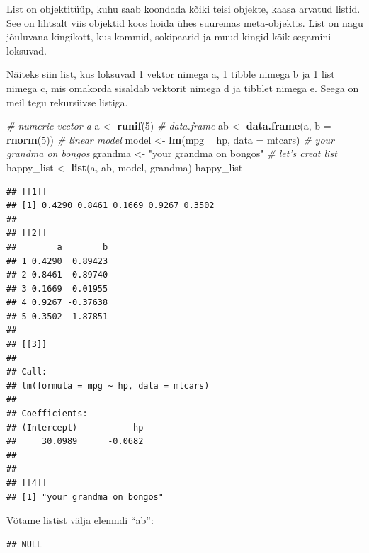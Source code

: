 \documentclass[]{book}
\newenvironment{Shaded}{\begin{snugshade}}{\end{snugshade}}
\newcommand{\KeywordTok}[1]{\textcolor[rgb]{0.13,0.29,0.53}{\textbf{#1}}}
\newcommand{\DataTypeTok}[1]{\textcolor[rgb]{0.13,0.29,0.53}{#1}}
\newcommand{\DecValTok}[1]{\textcolor[rgb]{0.00,0.00,0.81}{#1}}
\newcommand{\StringTok}[1]{\textcolor[rgb]{0.31,0.60,0.02}{#1}}
\newcommand{\CommentTok}[1]{\textcolor[rgb]{0.56,0.35,0.01}{\textit{#1}}}
\newcommand{\OperatorTok}[1]{\textcolor[rgb]{0.81,0.36,0.00}{\textbf{#1}}}
\newcommand{\NormalTok}[1]{#1}
\begin{document}
List on objektitüüp, kuhu saab koondada kõiki teisi objekte, kaasa
arvatud listid. See on lihtsalt viis objektid koos hoida ühes suuremas
meta-objektis. List on nagu jõuluvana kingikott, kus kommid, sokipaarid
ja muud kingid kõik segamini loksuvad.

Näiteks siin list, kus loksuvad 1 vektor nimega a, 1 tibble nimega b ja
1 list nimega c, mis omakorda sisaldab vektorit nimega d ja tibblet
nimega e. Seega on meil tegu rekursiivse listiga.

\begin{Shaded}
\begin{Highlighting}[]
\CommentTok{# numeric vector a}
\NormalTok{a <-}\StringTok{ }\KeywordTok{runif}\NormalTok{(}\DecValTok{5}\NormalTok{)}
\CommentTok{# data.frame}
\NormalTok{ab <-}\StringTok{ }\KeywordTok{data.frame}\NormalTok{(a, }\DataTypeTok{b =} \KeywordTok{rnorm}\NormalTok{(}\DecValTok{5}\NormalTok{))}
\CommentTok{# linear model}
\NormalTok{model <-}\StringTok{ }\KeywordTok{lm}\NormalTok{(mpg }\OperatorTok{~}\StringTok{ }\NormalTok{hp, }\DataTypeTok{data =}\NormalTok{ mtcars)}
\CommentTok{# your grandma on bongos}
\NormalTok{grandma <-}\StringTok{ "your grandma on bongos"}
\CommentTok{# let's creat list}
\NormalTok{happy_list <-}\StringTok{ }\KeywordTok{list}\NormalTok{(a, ab, model, grandma)}
\NormalTok{happy_list}
\end{Highlighting}
\end{Shaded}

\begin{verbatim}
## [[1]]
## [1] 0.4290 0.8461 0.1669 0.9267 0.3502
## 
## [[2]]
##        a        b
## 1 0.4290  0.89423
## 2 0.8461 -0.89740
## 3 0.1669  0.01955
## 4 0.9267 -0.37638
## 5 0.3502  1.87851
## 
## [[3]]
## 
## Call:
## lm(formula = mpg ~ hp, data = mtcars)
## 
## Coefficients:
## (Intercept)           hp  
##     30.0989      -0.0682  
## 
## 
## [[4]]
## [1] "your grandma on bongos"
\end{verbatim}

Võtame listist välja elemndi ``ab'':

\begin{Shaded}
\end{Shaded}

\begin{verbatim}
## NULL
\end{verbatim}
\end{document}
